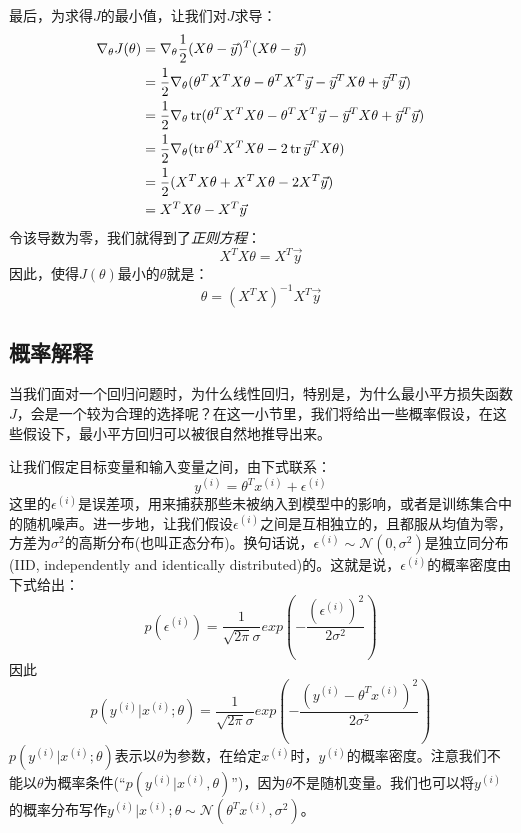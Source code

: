 最后，为求得$J$的最小值，让我们对$J$求导：
\begin{equation*}
\begin{split}
\nabla_\theta J(\theta) &= \nabla_\theta\frac{1}{2}(X\theta - \vec{y})^T(X\theta - \vec{y}) \\
&= \frac{1}{2}\nabla_\theta(\theta^TX^TX\theta - \theta^TX^T\vec{y} - \vec{y}^TX\theta + \vec{y}^T\vec{y}) \\
&= \frac{1}{2}\nabla_\theta\operatorname{tr}(\theta^TX^TX\theta - \theta^TX^T\vec{y} - \vec{y}^TX\theta + \vec{y}^T\vec{y}) \\
&= \frac{1}{2}\nabla_\theta(\operatorname{tr}\theta^TX^TX\theta - 2\operatorname{tr}\vec{y}^TX\theta) \\
&= \frac{1}{2}(X^TX\theta + X^TX\theta - 2X^T\vec{y}) \\
&= X^TX\theta - X^T\vec{y}
\end{split}
\end{equation*}
令该导数为零，我们就得到了\emph{正则方程}：
\begin{equation}
X^TX\theta = X^T\vec{y}
\end{equation}
因此，使得$J(\theta)$最小的$\theta$就是：
\begin{equation}
\theta = (X^TX)^{-1}X^T\vec{y}
\end{equation}

\subsection{概率解释}
当我们面对一个回归问题时，为什么线性回归，特别是，为什么最小平方损失函数$J$，会是一个较为合理的选择呢？在这一小节里，我们将给出一些概率假设，在这些假设下，最小平方回归可以被很自然地推导出来。

让我们假定目标变量和输入变量之间，由下式联系：
\begin{equation}
y^{(i)} = \theta^Tx^{(i)} + \epsilon^{(i)}
\end{equation}
这里的$\epsilon^{(i)}$是误差项，用来捕获那些未被纳入到模型中的影响，或者是训练集合中的随机噪声。进一步地，让我们假设$\epsilon^{(i)}$之间是互相独立的，且都服从均值为零，方差为$\sigma^2$的高斯分布(也叫正态分布)。换句话说，$\epsilon^{(i)} \sim \mathcal{N}(0, \sigma^2)$是独立同分布(IID, independently and identically distributed)的。这就是说，$\epsilon^{(i)}$的概率密度由下式给出：
\begin{equation*}
p(\epsilon^{(i)}) = \frac{1}{\sqrt{2\pi}\sigma}exp\left(-\frac{(\epsilon^{(i)})^2}{2\sigma^2}\right)
\end{equation*}
因此
\begin{equation}
p(y^{(i)}|x^{(i)};\theta) = \frac{1}{\sqrt{2\pi}\sigma}exp\left(-\frac{(y^{(i)} - \theta^Tx^{(i)})^2}{2\sigma^2}\right)
\end{equation}
$p(y^{(i)}|x^{(i)};\theta)$表示以$\theta$为参数，在给定$x^{(i)}$时，$y^{(i)}$的概率密度。注意我们不能以$\theta$为概率条件(``$p(y^{(i)}|x^{(i)},\theta)$'')，因为$\theta$不是随机变量。我们也可以将$y^{(i)}$的概率分布写作$y^{(i)}|x^{(i)};\theta \sim \mathcal{N}(\theta^Tx^{(i)}, \sigma^2)$。

